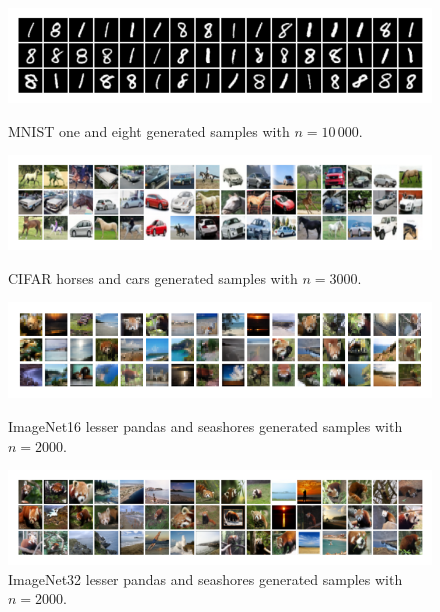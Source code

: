 \documentclass[10pt,twocolumn]{article}
\begin{document}
\begin{figure}[!htb]
\centering
\includegraphics[width=1\linewidth]{Figures_SM/samples_MNIST.pdf}
\caption{MNIST one and eight generated samples with $n=10\,000$.}
\label{fig:samples_MNIST}  

\centering
\includegraphics[width=1\linewidth]{Figures_SM/samples_CIFAR.pdf}
\caption{CIFAR horses and cars generated samples with $n=3000$.}
\label{fig:samples_CIFAR}  

\centering
\includegraphics[width=1\linewidth]{Figures_SM/samples_Imagenet16.pdf}
\caption{ImageNet16 lesser pandas and seashores generated samples with $n=2000$.}
\label{fig:samples_I16}  

\centering
\includegraphics[width=1\linewidth]{Figures_SM/samples_Imagenet32.pdf}
\caption{ImageNet32 lesser pandas and seashores generated samples with $n=2000$.}
\label{fig:samples_I32}  
\end{figure}
\end{document}
